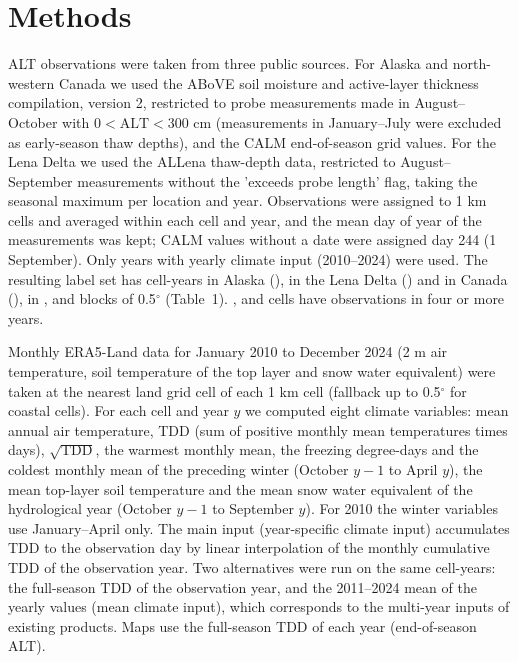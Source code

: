 \section{Methods}\label{sec:methods}

ALT observations were taken from three public sources. For Alaska and north-western Canada we used the ABoVE soil moisture and active-layer thickness compilation, version 2\cite{Moore2025}, restricted to probe measurements made in August--October with $0<\mathrm{ALT}<300$ cm (measurements in January--July were excluded as early-season thaw depths), and the CALM end-of-season grid values\cite{Streletskiy2025}. For the Lena Delta we used the ALLena thaw-depth data\cite{Veremeeva2025}, restricted to August--September measurements without the 'exceeds probe length' flag, taking the seasonal maximum per location and year. Observations were assigned to 1 km cells and averaged within each cell and year, and the mean day of year of the measurements was kept; CALM values without a date were assigned day 244 (1 September). Only years with yearly climate input (2010--2024) were used. The resulting label set has \nncyAk{} cell-years in Alaska (\nyrsAk), \nncyLe{} in the Lena Delta (\nyrsLe) and \nncyCa{} in Canada (\nyrsCa), in \nnblkAk, \nnblkLe{} and \nnblkCa{} blocks of 0.5$^\circ$ (Table~1). \nnmultiAk, \nnmultiLe{} and \nnmultiCa{} cells have observations in four or more years.

Monthly ERA5-Land data for January 2010 to December 2024\cite{munozsabater2021_era5_land} (2 m air temperature, soil temperature of the top layer and snow water equivalent) were taken at the nearest land grid cell of each 1 km cell (fallback up to 0.5$^\circ$ for coastal cells). For each cell and year $y$ we computed eight climate variables: mean annual air temperature, TDD (sum of positive monthly mean temperatures times days), $\sqrt{\mathrm{TDD}}$, the warmest monthly mean, the freezing degree-days and the coldest monthly mean of the preceding winter (October $y-1$ to April $y$), the mean top-layer soil temperature and the mean snow water equivalent of the hydrological year (October $y-1$ to September $y$). For 2010 the winter variables use January--April only. The main input (year-specific climate input) accumulates TDD to the observation day by linear interpolation of the monthly cumulative TDD of the observation year. Two alternatives were run on the same cell-years: the full-season TDD of the observation year, and the 2011--2024 mean of the yearly values (mean climate input), which corresponds to the multi-year inputs of existing products. Maps use the full-season TDD of each year (end-of-season ALT).

